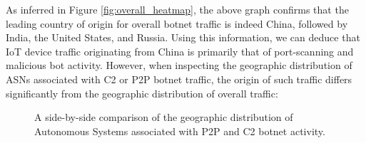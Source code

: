 As inferred in Figure \ref{fig:overall_heatmap}, the above graph confirms that the leading country of origin for overall botnet traffic is indeed China, followed by India, the United States, and Russia. Using this information, we can deduce that IoT device traffic originating from China is primarily that of port-scanning and malicious bot activity. However, when inspecting the geographic distribution of ASNs associated with C2 or P2P botnet traffic, the origin of such traffic differs significantly from the geographic distribution of overall traffic:

\begin{figure}[!htb]
    \centering
    \qquad
    \caption{A side-by-side comparison of the geographic distribution of Autonomous Systems associated with P2P and C2 botnet activity.}
    \label{fig:p2p_c2_asn_dist}
\end{figure}

